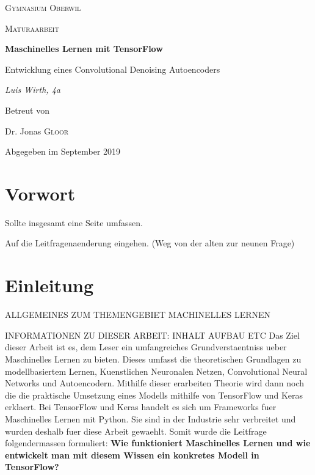 
\begin{titlepage}
  \centering

  {\scshape\LARGE Gymnasium Oberwil\par}
  \vspace{1cm}
  {\scshape\Large Maturaarbeit\par}
  \vspace{1.5cm}
  {\huge\bfseries Maschinelles Lernen mit TensorFlow\par}
  \vspace{0.1cm}
  {\large Entwicklung eines Convolutional Denoising Autoencoders\par}
  \vspace{2cm}
  {\Large\itshape Luis Wirth, 4a\par}
  \vfill
  Betreut von\par
  Dr. Jonas \textsc{Gloor}

  \vfill
  {\large Abgegeben im September 2019\par}
\end{titlepage}


\tableofcontents
\pagebreak

\chapter*{Vorwort}

Sollte insgesamt eine Seite umfassen.

Auf die Leitfragenaenderung eingehen. (Weg von der alten zur neunen Frage)

\chapter*{Einleitung}
ALLGEMEINES ZUM THEMENGEBIET MACHINELLES LERNEN

INFORMATIONEN ZU DIESER ARBEIT: INHALT AUFBAU ETC
Das Ziel dieser Arbeit ist es, dem Leser ein umfangreiches Grundverstaentniss
ueber Maschinelles Lernen zu bieten. Dieses umfasst die theoretischen Grundlagen
zu modellbasiertem Lernen, Kuenstlichen Neuronalen Netzen, Convolutional Neural
Networks und Autoencodern. Mithilfe dieser erarbeiten Theorie wird dann noch die
die praktische Umsetzung eines Modells mithilfe von TensorFlow und Keras
erklaert. Bei TensorFlow und Keras handelt es sich um Frameworks fuer
Maschinelles Lernen mit Python. Sie sind in der Industrie sehr verbreitet und
wurden deshalb fuer diese Arbeit gewaehlt.
\para{}
Somit wurde die Leitfrage folgendermassen formuliert:
\textbf{Wie funktioniert Maschinelles Lernen und wie entwickelt man mit diesem
  Wissen ein konkretes Modell in TensorFlow?}
\para{}

